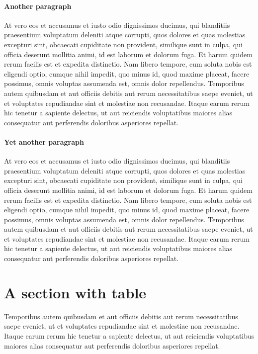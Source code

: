 \documentclass[letterpaper,12pt,leqno]{article}
\begin{document}
\paragraph{Another paragraph} At vero eos et accusamus et iusto odio dignissimos ducimus, qui blanditiis praesentium voluptatum deleniti atque corrupti, quos dolores et quas molestias excepturi sint, obcaecati cupiditate non provident, similique sunt in culpa, qui officia deserunt mollitia animi, id est laborum et dolorum fuga. Et harum quidem rerum facilis est et expedita distinctio. Nam libero tempore, cum soluta nobis est eligendi optio, cumque nihil impedit, quo minus id, quod maxime placeat, facere possimus, omnis voluptas assumenda est, omnis dolor repellendus. Temporibus autem quibusdam et aut officiis debitis aut rerum necessitatibus saepe eveniet, ut et voluptates repudiandae sint et molestiae non recusandae. Itaque earum rerum hic tenetur a sapiente delectus, ut aut reiciendis voluptatibus maiores alias consequatur aut perferendis doloribus asperiores repellat. 

\paragraph{Yet another paragraph} At vero eos et accusamus et iusto odio dignissimos ducimus, qui blanditiis praesentium voluptatum deleniti atque corrupti, quos dolores et quas molestias excepturi sint, obcaecati cupiditate non provident, similique sunt in culpa, qui officia deserunt mollitia animi, id est laborum et dolorum fuga. Et harum quidem rerum facilis est et expedita distinctio. Nam libero tempore, cum soluta nobis est eligendi optio, cumque nihil impedit, quo minus id, quod maxime placeat, facere possimus, omnis voluptas assumenda est, omnis dolor repellendus. Temporibus autem quibusdam et aut officiis debitis aut rerum necessitatibus saepe eveniet, ut et voluptates repudiandae sint et molestiae non recusandae. Itaque earum rerum hic tenetur a sapiente delectus, ut aut reiciendis voluptatibus maiores alias consequatur aut perferendis doloribus asperiores repellat. 

\section{A section with table}

Temporibus autem quibusdam et aut officiis debitis aut rerum necessitatibus saepe eveniet, ut et voluptates repudiandae sint et molestiae non recusandae. Itaque earum rerum hic tenetur a sapiente delectus, ut aut reiciendis voluptatibus maiores alias consequatur aut perferendis doloribus asperiores repellat. 
\end{document}
